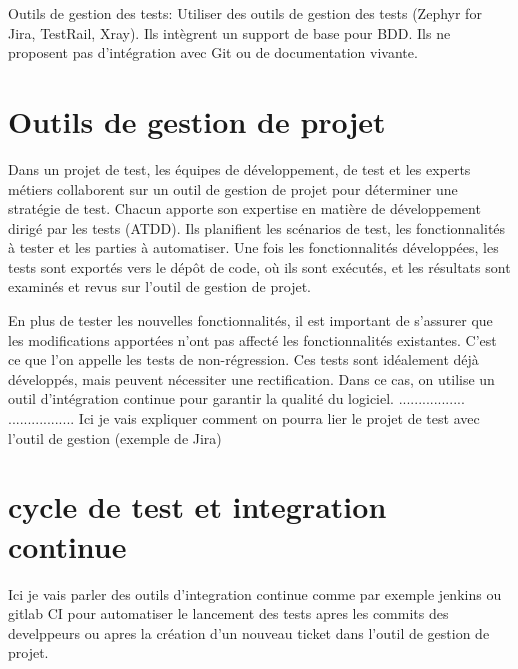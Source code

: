 Outils de gestion des tests:
Utiliser des outils de gestion des tests (Zephyr for Jira, TestRail, Xray).
Ils intègrent un support de base pour BDD.
Ils ne proposent pas d'intégration avec Git ou de documentation vivante.


\section{Outils de gestion de projet}
\label{sec:outils}
Dans un projet de test, les équipes de développement, de test et les experts métiers collaborent sur un outil de gestion de projet pour déterminer une stratégie de test. Chacun apporte son expertise en matière de développement dirigé par les tests (ATDD). Ils planifient les scénarios de test, les fonctionnalités à tester et les parties à automatiser. Une fois les fonctionnalités développées, les tests sont exportés vers le dépôt de code, où ils sont exécutés, et les résultats sont examinés et revus sur l'outil de gestion de projet.

En plus de tester les nouvelles fonctionnalités, il est important de s'assurer que les modifications apportées n'ont pas affecté les fonctionnalités existantes. C'est ce que l'on appelle les tests de non-régression. Ces tests sont idéalement déjà développés, mais peuvent nécessiter une rectification. Dans ce cas, on utilise un outil d'intégration continue pour garantir la qualité du logiciel.
.................
................. Ici je vais expliquer comment on pourra lier le projet de test avec l'outil de gestion (exemple de Jira)

\section{cycle de test et integration continue}

Ici je vais parler des outils d'integration continue comme par exemple jenkins ou gitlab CI pour automatiser le lancement des tests apres les commits des develppeurs ou apres la création d'un nouveau ticket dans l'outil de gestion de projet.
